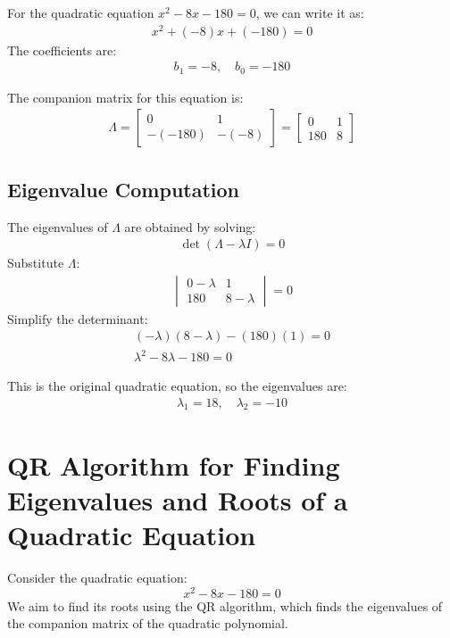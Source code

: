 \documentclass[journal]{IEEEtran}
\begin{document}
For the quadratic equation \( x^2 - 8x - 180 = 0 \), we can write it as:
\begin{align}
    x^2 + (-8)x + (-180) = 0
\end{align}
The coefficients are:
\begin{align*}
    b_1 = -8, \quad b_0 = -180
\end{align*}

The companion matrix for this equation is:
\begin{align}
    \Lambda =
    \begin{bmatrix}
        0 & 1 \\
        -(-180) & -(-8)
    \end{bmatrix}
    =
    \begin{bmatrix}
        0 & 1 \\
        180 & 8
    \end{bmatrix}
\end{align}


\subsection*{Eigenvalue Computation}
The eigenvalues of \( \Lambda \) are obtained by solving:
\begin{align}
    \det(\Lambda - \lambda I) = 0
\end{align}
Substitute \( \Lambda \):
\begin{align}
    \begin{vmatrix}
        0 - \lambda & 1 \\
        180 & 8 - \lambda
    \end{vmatrix}
    = 0
\end{align}
Simplify the determinant:
\begin{align}
    (-\lambda)(8 - \lambda) - (180)(1) = 0 \\
    \lambda^2 - 8\lambda - 180 = 0
\end{align}

This is the original quadratic equation, so the eigenvalues are:
\begin{align}
    \lambda_1 = 18, \quad \lambda_2 = -10
\end{align}
\section*{QR Algorithm for Finding Eigenvalues and Roots of a Quadratic Equation}

Consider the quadratic equation:
\[
x^2 - 8x - 180 = 0
\]
We aim to find its roots using the QR algorithm, which finds the eigenvalues of the companion matrix of the quadratic polynomial.
\end{document}
